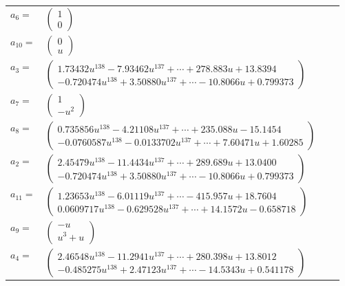 \documentclass[1p]{elsarticle_modified}
\theoremstyle{definition}
\begin{document}
\begin{tabular}{m{7pt} m{180pt} m{7pt} m{180pt} }
\flushright $a_{6}=$&$\begin{pmatrix}1\\0\end{pmatrix}$ \\
\flushright $a_{10}=$&$\begin{pmatrix}0\\u\end{pmatrix}$ \\
\flushright $a_{3}=$&$\begin{pmatrix}1.73432 u^{138}-7.93462 u^{137}+\cdots+278.883 u+13.8394\\-0.720474 u^{138}+3.50880 u^{137}+\cdots-10.8066 u+0.799373\end{pmatrix}$ \\
\flushright $a_{7}=$&$\begin{pmatrix}1\\- u^2\end{pmatrix}$ \\
\flushright $a_{8}=$&$\begin{pmatrix}0.735856 u^{138}-4.21108 u^{137}+\cdots+235.088 u-15.1454\\-0.0760587 u^{138}-0.0133702 u^{137}+\cdots+7.60471 u+1.60285\end{pmatrix}$ \\
\flushright $a_{2}=$&$\begin{pmatrix}2.45479 u^{138}-11.4434 u^{137}+\cdots+289.689 u+13.0400\\-0.720474 u^{138}+3.50880 u^{137}+\cdots-10.8066 u+0.799373\end{pmatrix}$ \\
\flushright $a_{11}=$&$\begin{pmatrix}1.23653 u^{138}-6.01119 u^{137}+\cdots-415.957 u+18.7604\\0.0609717 u^{138}-0.629528 u^{137}+\cdots+14.1572 u-0.658718\end{pmatrix}$ \\
\flushright $a_{9}=$&$\begin{pmatrix}- u\\u^3+u\end{pmatrix}$ \\
\flushright $a_{4}=$&$\begin{pmatrix}2.46548 u^{138}-11.2941 u^{137}+\cdots+280.398 u+13.8012\\-0.485275 u^{138}+2.47123 u^{137}+\cdots-14.5343 u+0.541178\end{pmatrix}$ \\

\end{tabular}
\end{document}
